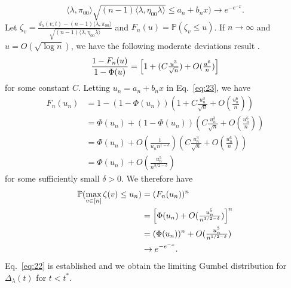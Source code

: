 \documentclass[10pt,journal,compsoc]{IEEEtran}
\theoremstyle{definition}
\begin{document}
\begin{IEEEproof}[Proposition~5]
\begin{equation}
{      \langle \lambda, \pi_{00} \rangle}{\sqrt{(n-1) \langle
        \lambda, \eta_{00} \lambda \rangle}} \leq a_n + b_n x\Big)
    \rightarrow 
    e^{-e^{-x}}. 
  \end{equation}
  Let $\zeta_v = \tfrac{d_{\lambda}(v;t) - (n-1) \langle \lambda,
    \pi_{00} \rangle}{\sqrt{(n-1) \langle \lambda, \eta_{00} \lambda
      \rangle}}$ and $F_n(u) = \mathbb{P}(\zeta_v \leq u)$. If $n
  \rightarrow \infty$ and $u = O(\sqrt{\log{n}})$, we have the
  following moderate deviations result \cite[Theorem~2, \S
  XVI.7]{feller71:_introd_probab_theor_its_applic,rubin65:_probab}.
  \begin{equation}
    \label{eq:23}
    \frac{1 - F_{n}(u)}{1 - \Phi(u)} = \Bigl[1 + (C\tfrac{u^{3}}{\sqrt{n}}) + O(\tfrac{u^{6}}{n}) \Bigr]
  \end{equation}
  for some constant $C$. Letting $u_n = a_n + b_n x$ in
  Eq.~\eqref{eq:23}, we have
  \begin{equation*}
    \begin{split}
      F_n(u_n) &= 1 - (1 - \Phi(u_n))(1 + C \tfrac{u_n^{3}}{\sqrt{n}} +
      O(\tfrac{u_n^{6}}{n})) \\
      &= \Phi(u_n) + (1 - \Phi(u_n))(C \tfrac{u_n^{3}}{\sqrt{n}} +
      O(\tfrac{u_n^6}{n})) \\
      &= \Phi(u_n) + O(\tfrac{1}{u_n n^{1- \delta}})(C \tfrac{u_n^{3}}{\sqrt{n}} +
      O(\tfrac{u_n^6}{n})) \\
      &= \Phi(u_n) + O(\tfrac{u_n^{5}}{n^{3/2 - \delta}})
    \end{split}
  \end{equation*}
  for some sufficiently small $\delta > 0$. We therefore have
  \begin{equation}
    \label{eq:25}
    \begin{split}
      \mathbb{P}(\max_{v \in [n]} \zeta(v) \leq u_n) &= (F_n(u_n))^{n} \\
      &= \Bigl[\Phi(u_n) + O(\tfrac{u_n^{5}}{n^{3/2 - \delta}})\Bigr]^{n} \\
      &= (\Phi(u_n))^{n} + O(\tfrac{u_n^{5}}{n^{1/2 - \delta}}) \\
      & \rightarrow e^{-e^{-x}}. 
    \end{split}
  \end{equation}
  Eq.~\eqref{eq:22} is established and we obtain the limiting Gumbel distribution for
  $\Delta_{\lambda}(t)$ for $t < t^{*}$.
  

\end{IEEEproof}
\end{document}
